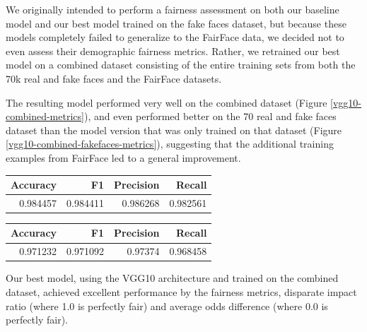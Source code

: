 \documentclass[11pt, letterpaper]{article}
\newenvironment{Figure}
  {\par\medskip\noindent\minipage{\linewidth}}
  {\endminipage\par\medskip}
\begin{document}
\begin{multicols}{2}
  We originally intended to perform a fairness assessment on both our baseline
  model and our best model trained on the fake faces dataset, but because 
  these models completely failed to generalize to the FairFace data,
  we decided not to even assess their demographic fairness metrics. Rather, we
  retrained our best model on a combined dataset consisting of the entire
  training sets from both the 70k real and fake faces and the FairFace datasets.

  The resulting model performed very well on the combined dataset (Figure
  \ref{vgg10-combined-metrics}), and even performed better on the 70 real and
  fake faces dataset than the model version that was only trained on that
  dataset (Figure \ref{vgg10-combined-fakefaces-metrics}), suggesting that the
  additional training examples from FairFace led to a general improvement. 

  \begin{Figure}
    \centering
    \label{vgg10-combined-metrics}
    \begin{tabular}{rrrr}
    \toprule
    Accuracy &        F1 &  Precision &    Recall \\
    \midrule
    0.984457 &  0.984411 &   0.986268 &  0.982561 \\
    \bottomrule
    \end{tabular}
  \end{Figure}

  \begin{Figure}
    \centering
    \label{vgg10-combined-fakefaces-metrics}
    \begin{tabular}{rrrr}
    \toprule
     Accuracy &        F1 &  Precision &    Recall \\
    \midrule
     0.971232 &  0.971092 &    0.97374 &  0.968458 \\
    \bottomrule
    \end{tabular}
    \end{Figure}    
  
  Our best model, using the VGG10 architecture and trained on the combined
  dataset, achieved excellent performance by the fairness metrics, disparate
  impact ratio (where 1.0 is perfectly fair) and average odds difference
  (where 0.0 is perfectly fair).
  

\end{multicols}
\end{document}

